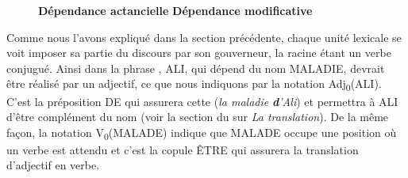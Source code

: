 \begin{figure}

   \textbf{Dépendance actancielle}  \textbf{Dépendance modificative}

\caption{\label{fig:}}
\end{figure}

Comme nous l’avons expliqué dans la section précédente, chaque unité lexicale se voit imposer sa partie du discours par son gouverneur, la racine étant un verbe conjugué. Ainsi dans la phrase , ALI, qui dépend du nom MALADIE, devrait être réalisé par un adjectif, ce que nous indiquons par la notation Adj\textsubscript{0}(ALI). C’est la préposition DE qui assurera cette  (\textit{la maladie} \textbf{\textit{d}}\textit{’Ali}) et permettra à ALI d’être complément du nom (voir la section du  sur \textit{La translation}). De la même façon, la notation V\textsubscript{0}(MALADE) indique que MALADE occupe une position où un verbe est attendu et c’est la copule ÊTRE qui assurera la translation d’adjectif en verbe.

